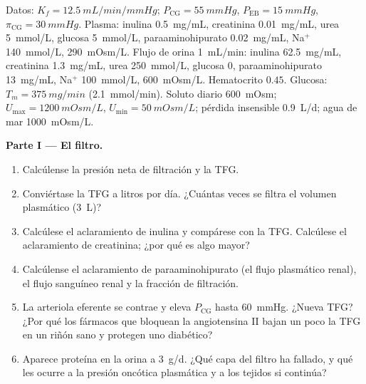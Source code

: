 \begin{problem}
\label{pb:b3:renal-osmoregulation:1}
Datos: $K_{f} = \qty{12.5}{mL/min/mmHg}$; $P_{\text{CG}} = \qty{55}{mmHg}$,
$P_{\text{EB}} = \qty{15}{mmHg}$, $\pi_{\text{CG}} = \qty{30}{mmHg}$.
Plasma: inulina \qty{0.5}{mg/mL}, creatinina \qty{0.01}{mg/mL}, urea
\qty{5}{mmol/L}, glucosa \qty{5}{mmol/L}, paraaminohipurato
\qty{0.02}{mg/mL}, Na$^{+}$ \qty{140}{mmol/L}, 
\qty{290}{mOsm/L}. Flujo de orina \qty{1}{mL/min}: inulina
\qty{62.5}{mg/mL}, creatinina \qty{1.3}{mg/mL}, urea \qty{250}{mmol/L},
glucosa $0$, paraaminohipurato \qty{13}{mg/mL}, Na$^{+}$
\qty{100}{mmol/L},  \qty{600}{mOsm/L}. Hematocrito $0.45$.
Glucosa: $T_{m} =
\qty{375}{mg/min}$ (\qty{2.1}{mmol/min}). Soluto diario \qty{600}{mOsm};
$U_{\max} = \qty{1200}{mOsm/L}$, $U_{\min} = \qty{50}{mOsm/L}$;
pérdida insensible \qty{0.9}{L/d}; agua de mar \qty{1000}{mOsm/L}.

\medskip
\noindent\textbf{Parte I --- El filtro.}
\begin{enumerate}
  \item Calcúlense la presión neta de filtración y la TFG.
  \item Conviértase la TFG a litros por día. ¿Cuántas veces se filtra
        el volumen plasmático (\qty{3}{L})?
  \item Calcúlese el aclaramiento de inulina y compárese con la TFG.
        Calcúlese el aclaramiento de creatinina; ¿por qué es algo
        mayor?
  \item Calcúlense el aclaramiento de paraaminohipurato (el flujo
        plasmático renal), el flujo sanguíneo renal y la fracción de
        filtración.
  \item La arteriola eferente se contrae y eleva $P_{\text{CG}}$ hasta
        \qty{60}{mmHg}. ¿Nueva TFG? ¿Por qué los fármacos que bloquean
        la angiotensina II bajan un poco la TFG en un riñón sano y
        protegen uno diabético?
  \item Aparece proteína en la orina a \qty{3}{g/d}. ¿Qué capa del
        filtro ha fallado, y qué les ocurre a la presión oncótica
        plasmática y a los tejidos si continúa?
\end{enumerate}


\end{problem}
